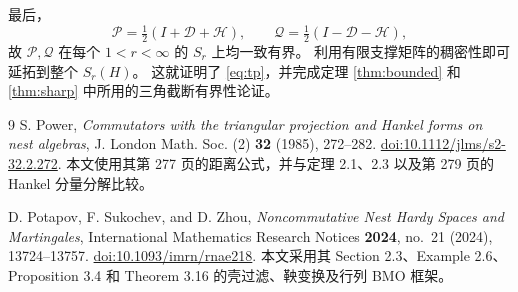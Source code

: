 \documentclass[UTF8,11pt,a4paper,fontset=fandol]{ctexart}
\theoremstyle{remark}
\newcommand{\PP}{\mathcal P}
\newcommand{\QQ}{\mathcal Q}
\newcommand{\DD}{\mathcal D}
\newcommand{\TriH}{\mathcal H}
\numberwithin{equation}{section}
\begin{document}
最后，
\[
 \PP=\tfrac12(I+\DD+\TriH),\qquad
 \QQ=\tfrac12(I-\DD-\TriH),
\]
故 $\PP,\QQ$ 在每个 $1<r<\infty$ 的 $S_r$ 上均一致有界。
利用有限支撑矩阵的稠密性即可延拓到整个 $S_r(H)$。
这就证明了 \eqref{eq:tp}，并完成定理 \ref{thm:bounded} 和
\ref{thm:sharp} 中所用的三角截断有界性论证。

\begin{thebibliography}{9}
S. Power,
\emph{Commutators with the triangular projection and Hankel forms on nest algebras},
J. London Math. Soc. (2) \textbf{32} (1985), 272--282.
\href{https://doi.org/10.1112/jlms/s2-32.2.272}{doi:10.1112/jlms/s2-32.2.272}.
本文使用其第 277 页的距离公式，并与定理 2.1、2.3
以及第 279 页的 Hankel 分量分解比较。

D. Potapov, F. Sukochev, and D. Zhou,
\emph{Noncommutative Nest Hardy Spaces and Martingales},
International Mathematics Research Notices \textbf{2024}, no.~21 (2024), 13724--13757.
\href{https://doi.org/10.1093/imrn/rnae218}{doi:10.1093/imrn/rnae218}.
本文采用其 Section 2.3、Example 2.6、Proposition 3.4
和 Theorem 3.16 的壳过滤、鞅变换及行列 BMO 框架。

\end{thebibliography}
\end{document}

